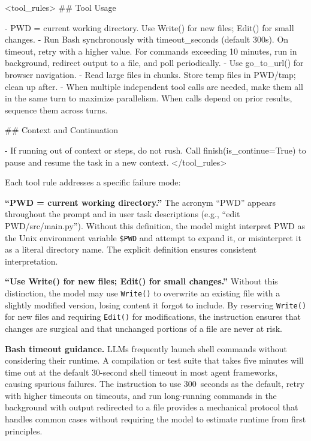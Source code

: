\documentclass{article}
\begin{document}
\begin{prompt}
<tool_rules>
## Tool Usage

- PWD = current working directory. Use Write() for new
  files; Edit() for small changes.
- Run Bash synchronously with timeout_seconds (default
  300s). On timeout, retry with a higher value.  For
  commands exceeding 10 minutes, run in background,
  redirect output to a file, and poll periodically.
- Use go_to_url() for browser navigation.
- Read large files in chunks. Store temp files in
  PWD/tmp; clean up after.
- When multiple independent tool calls are needed, make
  them all in the same turn to maximize parallelism.
  When calls depend on prior results, sequence them
  across turns.

## Context and Continuation

- If running out of context or steps, do not rush. Call
  finish(is_continue=True) to pause and resume the task
  in a new context.
</tool_rules>
\end{prompt}

Each tool rule addresses a specific failure mode:

\textbf{``PWD = current working directory.''}  The acronym ``PWD'' appears throughout the prompt and in user task descriptions (e.g., ``edit PWD/src/main.py'').  Without this definition, the model might interpret PWD as the Unix environment variable \texttt{\$PWD} and attempt to expand it, or misinterpret it as a literal directory name.  The explicit definition ensures consistent interpretation.

\textbf{``Use Write() for new files; Edit() for small changes.''}  Without this distinction, the model may use \texttt{Write()} to overwrite an existing file with a slightly modified version, losing content it forgot to include.  By reserving \texttt{Write()} for new files and requiring \texttt{Edit()} for modifications, the instruction ensures that changes are surgical and that unchanged portions of a file are never at risk.

\textbf{Bash timeout guidance.}  LLMs frequently launch shell commands without considering their runtime.  A compilation or test suite that takes five minutes will time out at the default 30-second shell timeout in most agent frameworks, causing spurious failures.  The instruction to use 300~seconds as the default, retry with higher timeouts on timeouts, and run long-running commands in the background with output redirected to a file provides a mechanical protocol that handles common cases without requiring the model to estimate runtime from first principles.
\end{document}
